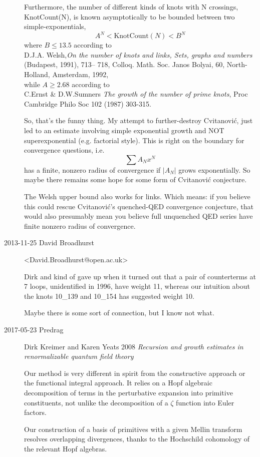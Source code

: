 \begin{description}
Furthermore, the number of different kinds of knots with N crossings,
KnotCount(N), is known asymptotically to be bounded between two
simple-exponentials,
\[
A^N < \mbox{KnotCount}(N) < B^N
\]
where
$B\leq 13.5$ according to\\
   D.J.A. Welsh,{\em On the number of knots and links, Sets, graphs and
numbers} (Budapest, 1991), 713– 718, Colloq. Math. Soc. Janos Bolyai,
60, North-Holland, Amsterdam, 1992,
\\
while
$A\geq 2.68$ according to\\
C.Ernst \& D.W.Sumners {\em The growth of the number of prime knots},
Proc Cambridge Philo Soc 102 (1987) 303-315.

So, that's the funny thing.
My attempt to further-destroy Cvitanovi\'c, just led to an estimate
involving simple
exponential growth and NOT superexponential (e.g. factorial style).
This is right on the boundary for convergence questions, i.e.
\[
\sum A_N  x^N
\]
has a finite, nonzero radius of convergence if $|A_N|$ grows
exponentially. So maybe there remains some hope for some form of
Cvitanovi\'c conjecture.

The Welsh upper bound also works for links. Which means: if you believe
this could rescue Cvitanovi\'c's quenched-QED convergence conjecture,
that would also presumably mean you believe full unquenched QED series
have finite nonzero radius of convergence.

\item[2013-11-25  David Broadhurst] <David.Broadhurst@open.ac.uk>

Dirk and kind of gave up when it turned out that a pair
of counterterms at 7 loops, unidentified in 1996,
have weight 11, whereas our intuition about the
knots 10\_139 and 10\_154 has suggested weight 10.

Maybe there is some sort of connection, but I know not what.

\item[2017-05-23 Predrag]
Dirk Kreimer and
{Karen Yeats} 2008
{\em Recursion and growth estimates in renormalizable quantum field theory}

Our method is very different in spirit from the constructive approach or the functional
integral approach. It relies on a Hopf algebraic decomposition of terms in the perturbative
expansion into primitive constituents, not unlike the decomposition of a $\zeta$ function
into Euler factors.

Our construction of a basis of primitives with a given Mellin
transform resolves overlapping divergences, thanks to the Hochschild cohomology of
the relevant Hopf algebras.


\end{description}
